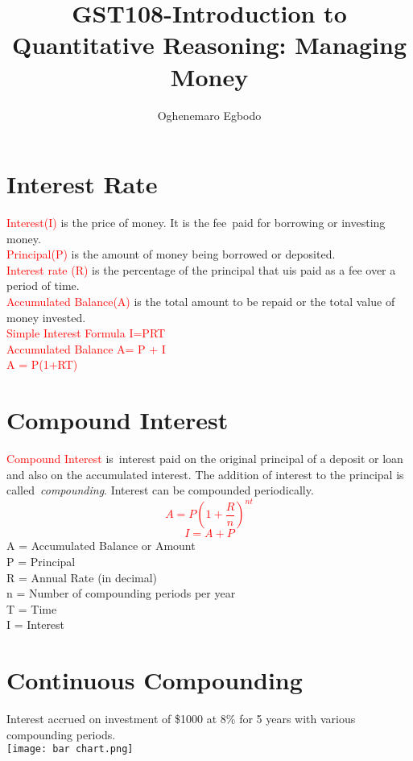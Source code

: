 \documentclass{article}
\begin{document}
	\title{GST108-Introduction to Quantitative Reasoning: Managing Money}
	\author{Oghenemaro Egbodo}
	\maketitle
	\newpage
	\tableofcontents
	\newpage
	\section{Interest Rate}
	\textcolor{red}{Interest(I)} is the price of money. It is the fee paid for borrowing or investing money.\\
	\textcolor{red}{Principal(P)}
is the amount of money being borrowed or deposited.\\
	\textcolor{red}{Interest rate (R)} is the percentage of the principal that uis paid as a fee over a period of time.\\
	\textcolor{red}{Accumulated Balance(A)} is the total amount to be repaid or the total value of money invested.\\
	\textcolor{red}{Simple Interest Formula I=PRT\\
		Accumulated Balance A= P + I\\
		A = P(1+RT)}
	\newpage
	\section{Compound Interest}
	\textcolor{red}{Compound Interest} is interest paid on the original principal of a deposit or loan and also on the accumulated interest.
	The addition of interest to the principal is called \textit{compounding}.
	Interest can be compounded periodically.
	\textcolor{red}{\begin{equation}
			A=P(1+\frac{R}{n})^{nt}
	\end{equation}}
    \textcolor{red}{\begin{equation}
    		I= A+P
    		\end{equation}}
	A = Accumulated Balance or Amount\\
	P = Principal \\ R = Annual Rate (in decimal)\\ n = Number of compounding periods per year\\
	T = Time\\
	I = Interest
	\newpage
	\section{Continuous Compounding}
	Interest accrued on investment of \$1000 at 8\% for 5 years with various compounding periods.\\
	\texttt{[image: bar chart.png]}
	\newpage
\end{document}
